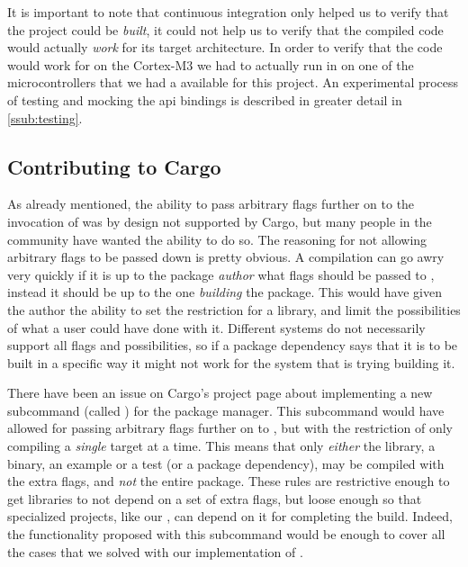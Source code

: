 It is important to note that continuous integration only helped us to verify that the project could be \emph{built}, it could not help us to verify that the compiled code would actually \emph{work} for its target architecture.
In order to verify that the code would work for on the Cortex-M3 we had to actually run in on one of the microcontrollers that we had a available for this project.
An experimental process of testing and mocking the {\emlib} \gls{api} bindings is described in greater detail in \autoref{ssub:testing}.

\subsection{Contributing to Cargo}
\label{ssub:contributing_to_cargo}

As already mentioned, the ability to pass arbitrary flags further on to the invocation of {\rustc} was by design not supported by Cargo, but many people in the {\rust} community have wanted the ability to do so.
The reasoning for not allowing arbitrary flags to be passed down is pretty obvious.
A compilation can go awry very quickly if it is up to the package \emph{author} what flags should be passed to {\rustc}, instead it should be up to the one \emph{building} the package.
This would have given the author the ability to set the restriction for a library, and limit the possibilities of what a user could have done with it.
Different systems do not necessarily support all flags and possibilities, so if a package dependency says that it is to be built in a specific way it might not work for the system that is trying building it.

There have been an issue on Cargo's project page about implementing a new subcommand (called ) for the package manager.
This subcommand would have allowed for passing arbitrary flags further on to {\rustc}, but with the restriction of only compiling a \emph{single} target at a time.
This means that only \emph{either} the library, a binary, an example or a test (or a package dependency), may be compiled with the extra flags, and \emph{not} the entire package.
These rules are restrictive enough to get libraries to not depend on a set of extra flags, but loose enough so that specialized projects, like our {\emlib}, can depend on it for completing the build.
Indeed, the functionality proposed with this subcommand would be enough to cover all the cases that we solved with our implementation of .

